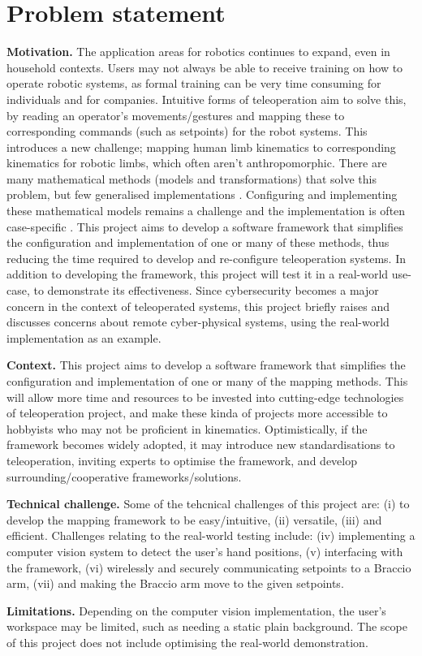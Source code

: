 \chapter{Problem statement}
\label{ch:problem_statement}

\textbf{Motivation.} The application areas for robotics continues to expand, even in household contexts. Users may not always be able to receive training on how to operate robotic systems, as formal training can be very time consuming for individuals and for companies. Intuitive forms of teleoperation aim to solve this, by reading an operator's movements/gestures and mapping these to corresponding commands (such as setpoints) for the robot systems. This introduces a new challenge; mapping human limb kinematics to corresponding kinematics for robotic limbs, which often aren't anthropomorphic. There are many mathematical methods (models and transformations) that solve this problem, but few generalised implementations \cite{bib:teleoperation_continuous_space}\cite{bib:teleoperation_continuous_space_2}. Configuring and implementing these mathematical models remains a challenge and the implementation is often case-specific \cite{bib:teleoperation_intuitive_using_MediaPipeHands}\cite{bib:teleoperation_surgery}. This project aims to develop a software framework that simplifies the configuration and implementation of one or many of these methods, thus reducing the time required to develop and re-configure teleoperation systems. In addition to developing the framework, this project will test it in a real-world use-case, to demonstrate its effectiveness. Since cybersecurity becomes a major concern in the context of teleoperated systems, this project briefly raises and discusses concerns about remote cyber-physical systems, using the real-world implementation as an example.

\textbf{Context.} This project aims to develop a software framework that simplifies the configuration and implementation of one or many of the mapping methods. This will allow more time and resources to be invested into cutting-edge technologies of teleoperation project, and make these kinda of projects more accessible to hobbyists who may not be proficient in kinematics. Optimistically, if the framework becomes widely adopted, it may introduce new standardisations to teleoperation, inviting experts to optimise the framework, and develop surrounding/cooperative frameworks/solutions.

\textbf{Technical challenge.} Some of the tehcnical challenges of this project are: (i) to develop the mapping framework to be easy/intuitive, (ii) versatile, (iii) and efficient. Challenges relating to the real-world testing include: (iv) implementing a computer vision system to detect the user's hand positions, (v) interfacing with the framework, (vi) wirelessly and securely communicating setpoints to a Braccio arm, (vii) and making the Braccio arm move to the given setpoints.

\textbf{Limitations.} Depending on the computer vision implementation, the user's workspace may be limited, such as needing a static plain background. The scope of this project does not include optimising the real-world demonstration.
